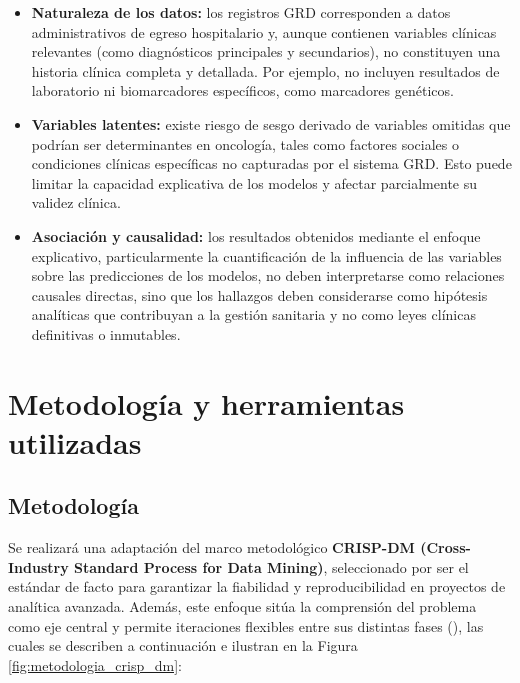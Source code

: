\begin{itemize}
\item \textbf{Naturaleza de los datos:} los registros GRD corresponden a datos administrativos de egreso hospitalario y, aunque contienen variables clínicas relevantes (como diagnósticos principales y secundarios), no constituyen una historia clínica completa y detallada. Por ejemplo, no incluyen resultados de laboratorio ni biomarcadores específicos, como marcadores genéticos.
\item \textbf{Variables latentes:} existe riesgo de sesgo derivado de variables omitidas que podrían ser determinantes en oncología, tales como factores sociales o condiciones clínicas específicas no capturadas por el sistema GRD. Esto puede limitar la capacidad explicativa de los modelos y afectar parcialmente su validez clínica.
\item \textbf{Asociación y causalidad:} los resultados obtenidos mediante el enfoque explicativo, particularmente la cuantificación de la influencia de las variables sobre las predicciones de los modelos, no deben interpretarse como relaciones causales directas, sino que los hallazgos deben considerarse como hipótesis analíticas que contribuyan a la gestión sanitaria y no como leyes clínicas definitivas o inmutables.
\end{itemize}


\section{Metodolog\'ia y herramientas utilizadas}
\label{intro:metodologia}

\subsection{Metodolog\'ia}
Se realizará una adaptación del marco metodológico \textbf{CRISP-DM (Cross-Industry Standard Process for Data Mining)}, seleccionado por ser el estándar de facto para garantizar la fiabilidad y reproducibilidad en proyectos de analítica avanzada. Además, este enfoque sitúa la comprensión del problema como eje central y permite iteraciones flexibles entre sus distintas fases (\cite{schroer2021systematic}), las cuales se describen a continuación e ilustran en la Figura \ref{fig:metodologia_crisp_dm}:

